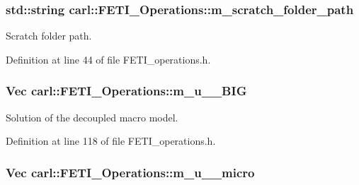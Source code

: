 \subsubsection[{m\+\_\+scratch\+\_\+folder\+\_\+path}]{\setlength{\rightskip}{0pt plus 5cm}std\+::string carl\+::\+F\+E\+T\+I\+\_\+\+Operations\+::m\+\_\+scratch\+\_\+folder\+\_\+path\hspace{0.3cm}{\ttfamily [protected]}}\label{classcarl_1_1_f_e_t_i___operations_ad6d35bc9b5221d45452fbc8931f22055}


Scratch folder path. 



Definition at line 44 of file F\+E\+T\+I\+\_\+operations.\+h.

\hypertarget{classcarl_1_1_f_e_t_i___operations_ad8097151d30d2d9b8acd6bc67caffcf4}{}
\subsubsection[{m\+\_\+u\+\_\+0\+\_\+\+B\+I\+G}]{\setlength{\rightskip}{0pt plus 5cm}Vec carl\+::\+F\+E\+T\+I\+\_\+\+Operations\+::m\+\_\+u\+\_\+\_\+\+B\+I\+G\hspace{0.3cm}{\ttfamily [protected]}}\label{classcarl_1_1_f_e_t_i___operations_ad8097151d30d2d9b8acd6bc67caffcf4}


Solution of the decoupled macro model. 



Definition at line 118 of file F\+E\+T\+I\+\_\+operations.\+h.

\hypertarget{classcarl_1_1_f_e_t_i___operations_a24aa345060f6ae75b71ce2071aa3a093}{}
\subsubsection[{m\+\_\+u\+\_\+0\+\_\+micro}]{\setlength{\rightskip}{0pt plus 5cm}Vec carl\+::\+F\+E\+T\+I\+\_\+\+Operations\+::m\+\_\+u\+\_\+\_\+micro\hspace{0.3cm}{\ttfamily [protected]}}\label{classcarl_1_1_f_e_t_i___operations_a24aa345060f6ae75b71ce2071aa3a093}



